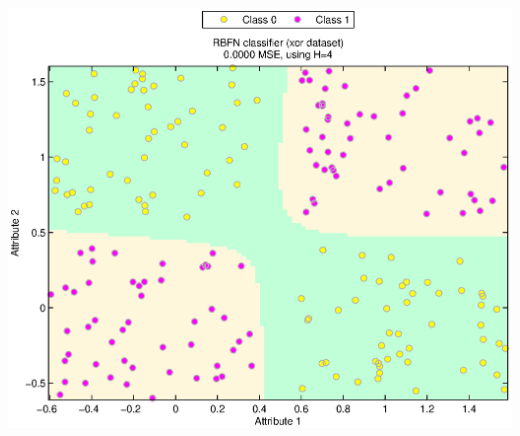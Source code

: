 \documentclass[journal]{IEEEtran}
\begin{document}
\clearpage%
\includegraphics[width=\columnwidth]{imagenes/xor}
\clearpage%
\end{document}
